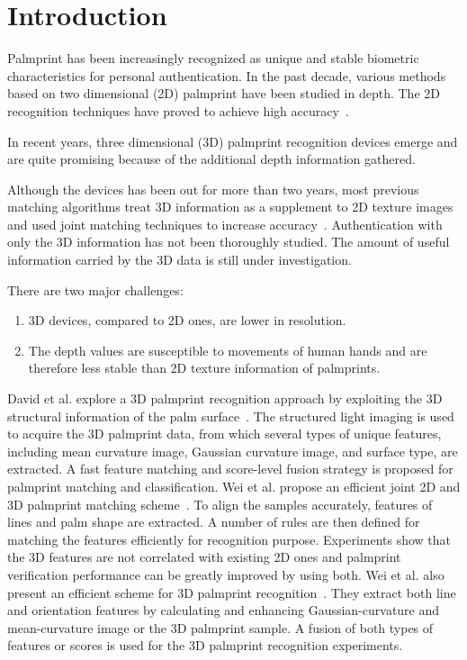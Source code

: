 \chapter{Introduction\label{ch:intro}}

Palmprint has been increasingly recognized as unique and stable biometric characteristics for personal authentication. In the past decade, various methods based on two dimensional (2D) palmprint have been studied in depth. The 2D recognition techniques have proved to achieve high accuracy~\cite{Kong:2009hj}.

In recent years, three dimensional (3D) palmprint recognition devices emerge and are quite promising because of the additional depth information gathered.

Although the devices has been out for more than two years, most previous matching algorithms treat 3D information as a supplement to 2D texture images and used joint matching techniques to increase accuracy~\cite{Li:2011ur, Li:2010en, Zhang:2009dp, Zhang:2008kc, Zhang:2010uu}. Authentication with only the 3D information has not been thoroughly studied. The amount of useful information carried by the 3D data is still under investigation.

There are two major challenges:

\begin{enumerate}
\item 3D devices, compared to 2D ones, are lower in resolution.
\item The depth values are susceptible to movements of human hands and are therefore less stable than 2D texture information of palmprints.
\end{enumerate}

David et al. explore a 3D palmprint recognition approach by exploiting the 3D structural information of the palm surface~\cite{Zhang:2009dp, Zhang:2008kc}. The structured light imaging is used to acquire the 3D palmprint data, from which several types of unique features, including mean curvature image, Gaussian curvature image, and surface type, are extracted. A fast feature matching and score-level fusion strategy is proposed for palmprint matching and classification. Wei et al. propose an efficient joint 2D and 3D palmprint matching scheme~\cite{Li:2010en}. To align the samples accurately, features of lines and palm shape are extracted. A number of rules are then defined for matching the features efficiently for recognition purpose. Experiments show that the 3D features are not correlated with existing 2D ones and palmprint verification performance can be greatly improved by using both. Wei et al. also present an efficient scheme for 3D palmprint recognition~\cite{Li:2011ur}. They extract both line and orientation features by calculating and enhancing Gaussian-curvature and mean-curvature image or the 3D palmprint sample. A fusion of both types of features or scores is used for the 3D palmprint recognition experiments.

